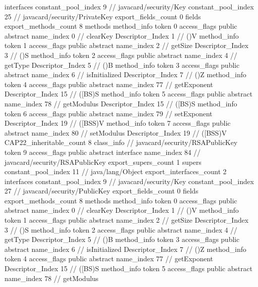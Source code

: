 {{{			interfaces {
				constant_pool_index	9		// javacard/security/Key
				constant_pool_index	25		// javacard/security/PrivateKey
			}
			export_fields_count	0
			fields {
			}
			export_methods_count	8
			methods {
				method_info {
					token	0
					access_flags	public abstract
					name_index	0		// clearKey
					Descriptor_Index	1		// ()V
				}
				method_info {
					token	1
					access_flags	public abstract
					name_index	2		// getSize
					Descriptor_Index	3		// ()S
				}
				method_info {
					token	2
					access_flags	public abstract
					name_index	4		// getType
					Descriptor_Index	5		// ()B
				}
				method_info {
					token	3
					access_flags	public abstract
					name_index	6		// isInitialized
					Descriptor_Index	7		// ()Z
				}
				method_info {
					token	4
					access_flags	public abstract
					name_index	77		// getExponent
					Descriptor_Index	15		// ([BS)S
				}
				method_info {
					token	5
					access_flags	public abstract
					name_index	78		// getModulus
					Descriptor_Index	15		// ([BS)S
				}
				method_info {
					token	6
					access_flags	public abstract
					name_index	79		// setExponent
					Descriptor_Index	19		// ([BSS)V
				}
				method_info {
					token	7
					access_flags	public abstract
					name_index	80		// setModulus
					Descriptor_Index	19		// ([BSS)V
				}
			}
			CAP22_inheritable_count	8
		}
		class_info {		// javacard/security/RSAPublicKey
			token	9
			access_flags	public abstract interface
			name_index	84		// javacard/security/RSAPublicKey
			export_supers_count	1
			supers {
				constant_pool_index	11		// java/lang/Object
			}
			export_interfaces_count	2
			interfaces {
				constant_pool_index	9		// javacard/security/Key
				constant_pool_index	27		// javacard/security/PublicKey
			}
			export_fields_count	0
			fields {
			}
			export_methods_count	8
			methods {
				method_info {
					token	0
					access_flags	public abstract
					name_index	0		// clearKey
					Descriptor_Index	1		// ()V
				}
				method_info {
					token	1
					access_flags	public abstract
					name_index	2		// getSize
					Descriptor_Index	3		// ()S
				}
				method_info {
					token	2
					access_flags	public abstract
					name_index	4		// getType
					Descriptor_Index	5		// ()B
				}
				method_info {
					token	3
					access_flags	public abstract
					name_index	6		// isInitialized
					Descriptor_Index	7		// ()Z
				}
				method_info {
					token	4
					access_flags	public abstract
					name_index	77		// getExponent
					Descriptor_Index	15		// ([BS)S
				}
				method_info {
					token	5
					access_flags	public abstract
					name_index	78		// getModulus
}}}}}

